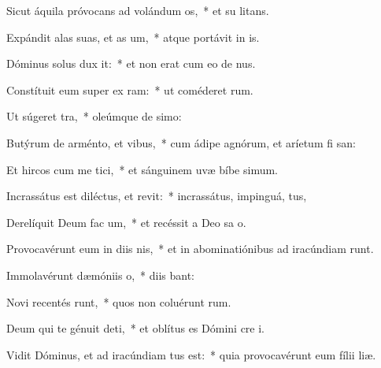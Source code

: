 \item Sicut áquila próvocans ad volándum  os,~* et su  litans.
\item Expándit alas suas, et as um,~* atque portávit in  is.
\item Dóminus solus dux  it:~* et non erat cum eo de nus.
\item Constítuit eum super ex ram:~* ut coméderet  rum.
\item Ut súgeret   tra,~* oleúmque de  simo:
\item Butýrum de arménto, et   vibus,~* cum ádipe agnórum, et aríetum fi san:
\item Et hircos cum me tici,~* et sánguinem uvæ bíbe simum.
\item Incrassátus est diléctus, et revit:~* incrassátus, impinguá, tus,
\item Derelíquit Deum fac um,~* et recéssit a Deo sa o.
\item Provocavérunt eum in diis nis,~* et in abominatiónibus ad iracúndiam runt.
\item Immolavérunt dæmóniis   o,~* diis  bant:
\item Novi recentés runt,~* quos non coluérunt  rum.
\item Deum qui te génuit deti,~* et oblítus es Dómini cre i.
\item \singlecolsep
\item Vidit Dóminus, et ad iracúndiam tus est:~* quia provocavérunt eum fílii   liæ.
